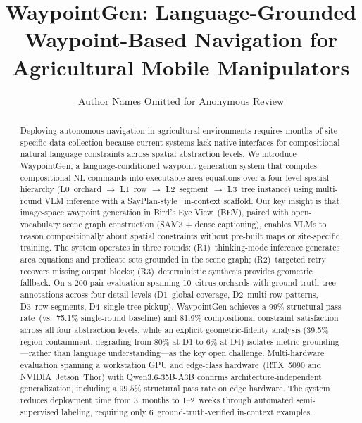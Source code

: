 \documentclass{article}
\title{\LARGE \bf
WaypointGen: Language-Grounded Waypoint-Based Navigation for Agricultural Mobile Manipulators}
\author{Author Names Omitted for Anonymous Review}
\begin{document}
\maketitle
\thispagestyle{empty}


\begin{abstract}
Deploying autonomous navigation in agricultural environments requires months of site-specific data collection because current systems lack native interfaces for compositional natural language constraints across spatial abstraction levels.
We introduce WaypointGen, a language-conditioned waypoint generation system that compiles compositional NL commands into executable area equations over a four-level spatial hierarchy (L0~orchard $\to$ L1~row $\to$ L2~segment $\to$ L3~tree instance) using multi-round VLM inference with a SayPlan-style~\citep{rana2023sayplan} in-context scaffold.
Our key insight is that image-space waypoint generation in Bird's Eye View~(BEV), paired with open-vocabulary scene graph construction (SAM3 + dense captioning), enables VLMs to reason compositionally about spatial constraints without pre-built maps or site-specific training.
The system operates in three rounds: (R1)~thinking-mode inference generates area equations and predicate sets grounded in the scene graph; (R2)~targeted retry recovers missing output blocks; (R3)~deterministic synthesis provides geometric fallback.
On a 200-pair evaluation spanning 10~citrus orchards with ground-truth tree annotations across four detail levels (D1~global coverage, D2~multi-row patterns, D3~row segments, D4~single-tree pickup), WaypointGen achieves a 99\% structural pass rate~(vs.\ 75.1\% single-round baseline) and 81.9\% compositional constraint satisfaction across all four abstraction levels, while an explicit geometric-fidelity analysis (39.5\% region containment, degrading from 80\% at D1 to 6\% at D4) isolates metric grounding---rather than language understanding---as the key open challenge.
Multi-hardware evaluation spanning a workstation GPU and edge-class hardware~(RTX~5090 and NVIDIA~Jetson~Thor) with Qwen3.6-35B-A3B confirms architecture-independent generalization, including a $99.5\%$ structural pass rate on edge hardware.
The system reduces deployment time from 3~months to 1--2~weeks through automated semi-supervised labeling, requiring only 6~ground-truth-verified in-context examples.
\end{abstract}

\end{document}
